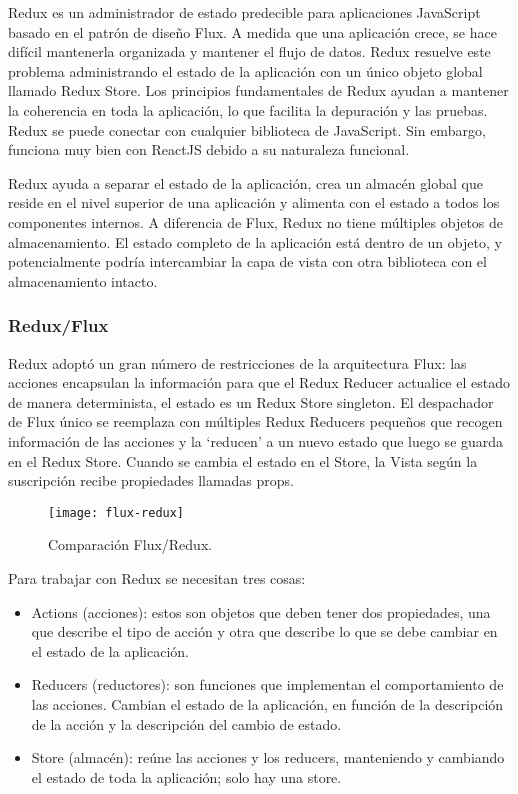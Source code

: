 Redux es un administrador de estado predecible para aplicaciones JavaScript basado en el patrón de diseño Flux. A medida que una aplicación crece, se hace difícil mantenerla organizada y mantener el flujo de datos. Redux resuelve este problema administrando el estado de la aplicación con un único objeto global llamado Redux Store. Los principios fundamentales de Redux ayudan a mantener la coherencia en toda la aplicación, lo que facilita la depuración y las pruebas. Redux se puede conectar con cualquier biblioteca de JavaScript. Sin embargo, funciona muy bien con ReactJS debido a su naturaleza funcional.
\vspace{0.8cm}

Redux ayuda a separar el estado de la aplicación, crea un almacén global que reside en el nivel superior de una aplicación y alimenta con el estado a todos los componentes internos. A diferencia de Flux, Redux no tiene múltiples objetos de almacenamiento. El estado completo de la aplicación está dentro de un objeto, y potencialmente podría intercambiar la capa de vista con otra biblioteca con el almacenamiento intacto.

\subsubsection{Redux/Flux}
Redux adoptó un gran número de restricciones de la arquitectura Flux: las acciones encapsulan la información para que el Redux Reducer actualice el estado de manera determinista, el estado es un Redux Store singleton. El despachador de Flux único se reemplaza con múltiples Redux Reducers pequeños que recogen información de las acciones y la `reducen' a un nuevo estado que luego se guarda en el Redux Store. Cuando se cambia el estado en el Store, la Vista según la suscripción recibe propiedades llamadas props.
\vspace{0.8cm}

\begin{figure}[H]
  \centering
  \texttt{[image: flux-redux]}
  \caption{Comparación Flux/Redux.}
\end{figure}
\vspace{0.8cm}

Para trabajar con Redux se necesitan tres cosas:
\begin{itemize}
  \item Actions (acciones): estos son objetos que deben tener dos propiedades, una que describe el tipo de acción y otra que describe lo que se debe cambiar en el estado de la aplicación.

  \item Reducers (reductores): son funciones que implementan el comportamiento de las acciones. Cambian el estado de la aplicación, en función de la descripción de la acción y la descripción del cambio de estado.

  \item Store (almacén): reúne las acciones y los reducers, manteniendo y cambiando el estado de toda la aplicación; solo hay una store.
\end{itemize}

